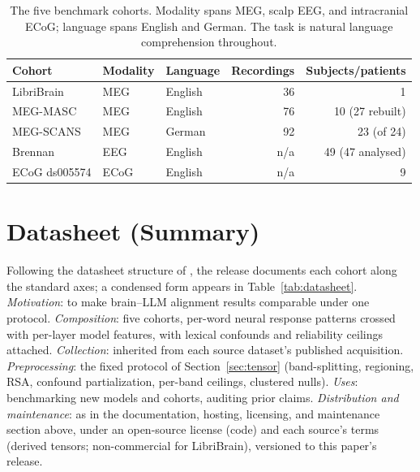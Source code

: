 \documentclass{article}
\begin{document}
\begin{table}[t]
\centering
\setlength{\tabcolsep}{4pt}
\begin{tabular}{lllrr}
\toprule
Cohort & Modality & Language & Recordings & Subjects/patients \\
\midrule
LibriBrain \citep{ozdogan2025libribrain} & MEG & English & 36 & 1 \\
MEG-MASC \citep{gwilliams2023megmasc} & MEG & English & 76 & 10 (27 rebuilt) \\
MEG-SCANS \citep{habersetzer2025megscans} & MEG & German & 92 & 23 (of 24) \\
Brennan \citep{brennan2019hierarchical} & EEG & English & n/a & 49 (47 analysed) \\
ECoG ds005574 \citep{zada2025podcast} & ECoG & English & n/a & 9 \\
\bottomrule
\end{tabular}
\caption{The five benchmark cohorts. Modality spans MEG, scalp EEG, and
intracranial ECoG; language spans English and German. The task is natural
language comprehension throughout.}
\label{tab:cohorts}
\end{table}

\section*{Datasheet (Summary)}\label{datasheet}

Following the datasheet structure of \citet{gebru2021datasheets}, the release
documents each cohort along the standard axes; a condensed form appears in
Table~\ref{tab:datasheet}. \emph{Motivation}: to make brain--LLM alignment results
comparable under one protocol. \emph{Composition}: five cohorts, per-word neural
response patterns crossed with per-layer model features, with lexical confounds and
reliability ceilings attached. \emph{Collection}: inherited from each source
dataset's published acquisition. \emph{Preprocessing}: the fixed protocol of
Section~\ref{sec:tensor} (band-splitting, regioning, RSA, confound
partialization, per-band ceilings, clustered nulls). \emph{Uses}: benchmarking new
models and cohorts, auditing prior claims. \emph{Distribution and maintenance}: as
in the documentation, hosting, licensing, and maintenance section above, under
an open-source license (code) and each source's terms (derived tensors;
non-commercial for LibriBrain), versioned to this paper's release.
\end{document}
